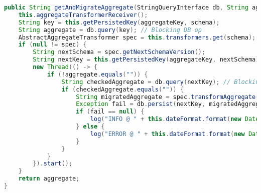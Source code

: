 \begin{lstlisting}[language=Java, caption={Metode for håndtering av GET-spørring i Migrator.}]
public String getAndMigrateAggregate(StringQueryInterface db, String aggregateKey, String schema) {
    this.aggregateTransformerReceiver();
    String key = this.getPersistedKey(aggregateKey, schema);
    String aggregate = db.query(key); // Blocking DB op
    AbstractAggregateTransformer spec = this.transformers.get(schema);
    if (null != spec) {
        String nextSchema = spec.getNextSchemaVersion();
        String nextKey = this.getPersistedKey(aggregateKey, nextSchema);
        new Thread(() -> {
            if (!aggregate.equals("")) {
                String checkedAggregate = db.query(nextKey); // Blocking DB op
                if (checkedAggregate.equals("")) {
                    String migratedAggregate = spec.transformAggregate(aggregate);
                    Exception fail = db.persist(nextKey, migratedAggregate); // Blocking DB op
                    if (fail == null) {
                        log("INFO @ " + this.dateFormat.format(new Date()) + " - Migrated aggregate with key " + key + " to " + nextKey + "\n");
                    } else {
                        log("ERROR @ " + this.dateFormat.format(new Date()) + " - Error during migration from " + key + " to " + nextKey + ":\n" + fail.toString() + "\n");
                    }
                }
            }
        }).start();
    }
    return aggregate;
}
\end{lstlisting}
